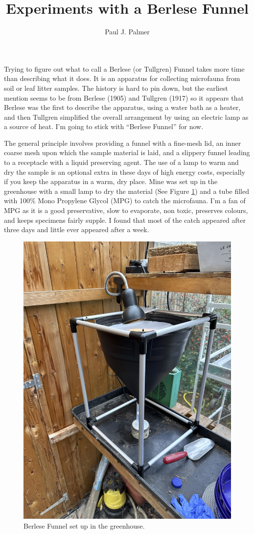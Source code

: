 \documentclass[
]{article}
\title{Experiments with a Berlese Funnel}
\author{Paul J. Palmer}
\date{}
\begin{document}
\maketitle

Trying to figure out what to call a Berlese (or Tullgren) Funnel takes more time than describing what it does. It is an apparatus for collecting microfauna from soil or leaf litter samples. The history is hard to pin down, but the earliest mention seems to be from Berlese (1905) and Tullgren (1917) so it appears that Berlese was the first to describe the apparatus, using a water bath as a heater, and then Tullgren simplified the overall arrangement by using an electric lamp as a source of heat. I'm going to stick with ``Berlese Funnel'' for now.

The general principle involves providing a funnel with a fine-mesh lid, an inner coarse mesh upon which the sample material is laid, and a slippery funnel leading to a receptacle with a liquid preserving agent. The use of a lamp to warm and dry the sample is an optional extra in these days of high energy costs, especially if you keep the apparatus in a warm, dry place. Mine was set up in the greenhouse with a small lamp to dry the material (See Figure \ref{fig:BerleseFunnel}) and a tube filled with 100\% Mono Propylene Glycol (MPG) to catch the microfauna. I'm a fan of MPG as it is a good preservative, slow to evaporate, non toxic, preserves colours, and keeps specimens fairly supple. I found that most of the catch appeared after three days and little ever appeared after a week.

\begin{figure}

{\centering \includegraphics[width=0.8\linewidth]{images/BerleseFunnel} 

}

\caption{Berlese Funnel set up in the greenhouse.}\label{fig:BerleseFunnel}
\end{figure}
\end{document}
